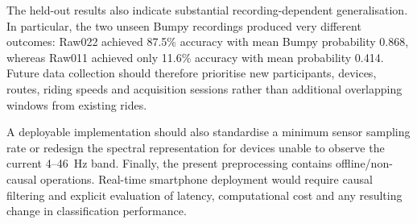 The held-out results also indicate substantial recording-dependent
generalisation. In particular, the two unseen Bumpy recordings produced very
different outcomes: Raw022 achieved 87.5\% accuracy with mean Bumpy
probability 0.868, whereas Raw011 achieved only 11.6\% accuracy with mean
probability 0.414. Future data collection should therefore prioritise new
participants, devices, routes, riding speeds and acquisition sessions rather
than additional overlapping windows from existing rides.

A deployable implementation should also standardise a minimum sensor sampling
rate or redesign the spectral representation for devices unable to observe
the current 4--46~Hz band. Finally, the present preprocessing contains
offline/non-causal operations. Real-time smartphone deployment would require
causal filtering and explicit evaluation of latency, computational cost and
any resulting change in classification performance.